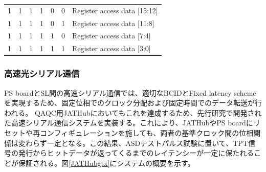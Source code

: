 \begin{table}[]
\begin{tabular}{|cccccc|l|}
    \multicolumn{1}{|c}{1} & 1                      & 1                      & 1                      & 0                      & 0 & Register access data {[}15:12{]}       \\  
    \multicolumn{1}{|c}{1} & 1                      & 1                      & 1                      & 0                      & 1 & Register access data {[}11:8{]}        \\  
    \multicolumn{1}{|c}{1} & 1                      & 1                      & 1                      & 1                      & 0 & Register access data {[}7:4{]}         \\  
    \multicolumn{1}{|c}{1} & 1                      & 1                      &1                       & 1                      & 1 & Register access data {[}3:0{]}         \\  \hline
    \end{tabular}
    \end{table}

\subsubsection{高速光シリアル通信}
\baselineskip
\label{subsubsec_gtx}
PS boardとSL間の高速シリアル通信では、適切なBCIDとFixed latency schemeを実現するため、固定位相でのクロック分配および固定時間でのデータ転送が行われる。
QAQC用JATHubにおいてもこれを達成するため、先行研究\cite{mt_aoki}で開発された高速シリアル通信システムを実装する。これにより、JATHubやPS boardにリセットや再コンフィギュレーションを施しても、両者の基準クロック間の位相関係は変わらず一定となる。この結果、ASDテストパルス試験に置いて、TPT信号の発行からヒットデータが返ってくるまでのレイテンシーが一定に保たれることが保証される。図\ref{JATHubgtx}にシステムの概要を示す。



